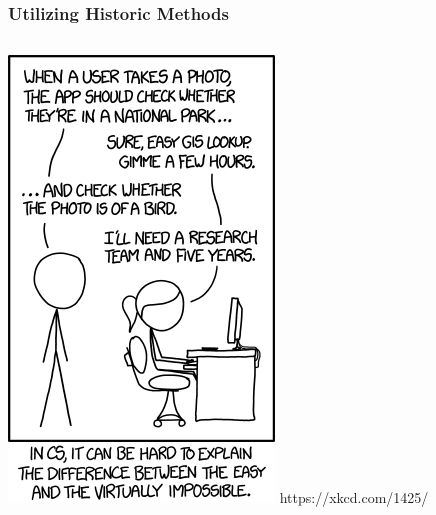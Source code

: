 \begin{frame}
   \frametitle{Utilizing Historic Methods}
   \centering
   \begin{columns}
      \begin{column}{0.25\linewidth}
         \centering
         \includegraphics[width=\columnwidth]{images/tasks.png}
         \vfill \tiny{https://xkcd.com/1425/}
      \end{column}
      \begin{column}{0.75\linewidth}
         \centering

\end{column}
\end{columns}
\end{frame}
